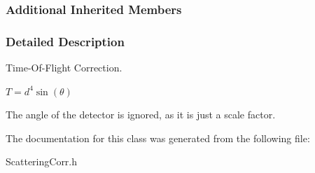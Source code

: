 \subsubsection*{Additional Inherited Members}


\subsubsection{Detailed Description}
Time-\/\-Of-\/\-Flight Correction. 

$ T = d^4\sin(\theta) $

The  angle of the detector is ignored, as it is just a scale factor. 

The documentation for this class was generated from the following file\-:\begin{DoxyCompactItemize}
\item 
Scattering\-Corr.\-h\end{DoxyCompactItemize}

